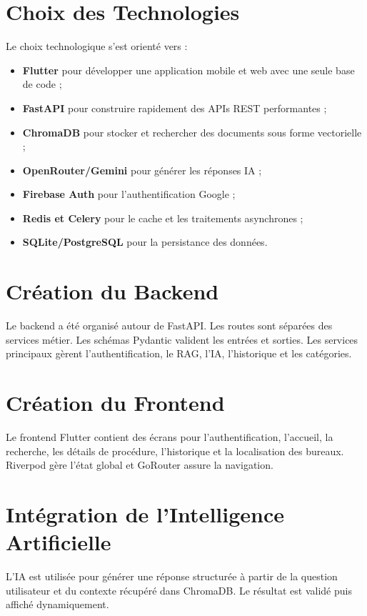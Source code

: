 \documentclass[12pt,a4paper]{report}
\begin{document}
\section{Choix des Technologies}

Le choix technologique s'est orienté vers :

\begin{itemize}
    \item \textbf{Flutter} pour développer une application mobile et web avec une seule base de code ;
    \item \textbf{FastAPI} pour construire rapidement des APIs REST performantes ;
    \item \textbf{ChromaDB} pour stocker et rechercher des documents sous forme vectorielle ;
    \item \textbf{OpenRouter/Gemini} pour générer les réponses IA ;
    \item \textbf{Firebase Auth} pour l'authentification Google ;
    \item \textbf{Redis et Celery} pour le cache et les traitements asynchrones ;
    \item \textbf{SQLite/PostgreSQL} pour la persistance des données.
\end{itemize}

\section{Création du Backend}

Le backend a été organisé autour de FastAPI. Les routes sont séparées des services métier. Les schémas Pydantic valident les entrées et sorties. Les services principaux gèrent l'authentification, le RAG, l'IA, l'historique et les catégories.

\section{Création du Frontend}

Le frontend Flutter contient des écrans pour l'authentification, l'accueil, la recherche, les détails de procédure, l'historique et la localisation des bureaux. Riverpod gère l'état global et GoRouter assure la navigation.

\section{Intégration de l'Intelligence Artificielle}

L'IA est utilisée pour générer une réponse structurée à partir de la question utilisateur et du contexte récupéré dans ChromaDB. Le résultat est validé puis affiché dynamiquement.
\end{document}
